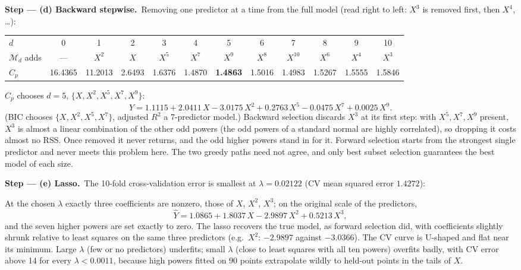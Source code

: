 \documentclass[11pt,a4paper]{article}
\numberwithin{equation}{questao}   %
\newcommand{\passo}[2]{\par\smallskip\noindent\textbf{Step --- #1.}~#2}
\begin{document}
\begin{sol}
\passo{(d) Backward stepwise}{Removing one predictor at a time from the full model (read right to
left: $X^3$ is removed first, then $X^4$, \dots):}
\begin{center}\footnotesize\setlength{\tabcolsep}{2.6pt}
\begin{tabular}{lccccccccccc}
\toprule
$d$ & 0 & 1 & 2 & 3 & 4 & 5 & 6 & 7 & 8 & 9 & 10\\
$\mathcal M_d$ adds & --- & $X^2$ & $X$ & $X^5$ & $X^7$ & $X^9$ & $X^8$ & $X^{10}$ & $X^6$ & $X^4$ & $X^3$\\
$C_p$ & 16.4365 & 11.2013 & 2.6493 & 1.6376 & 1.4870 & \textbf{1.4863} & 1.5016 & 1.4983 & 1.5267 & 1.5555 & 1.5846\\
\bottomrule
\end{tabular}
\end{center}
$C_p$ chooses $d=5$, $\{X,X^2,X^5,X^7,X^9\}$:
\[
\hat Y=1.1115+2.0411\,X-3.0175\,X^2+0.2763\,X^5-0.0475\,X^7+0.0025\,X^9 .
\]
(BIC chooses $\{X,X^2,X^5,X^7\}$, adjusted $R^2$ a 7-predictor model.) Backward selection discards
$X^3$ at its first step: with $X^5,X^7,X^9$ present, $X^3$ is almost a linear combination of the other
odd powers (the odd powers of a standard normal are highly correlated), so dropping it costs almost no
RSS. Once removed it never returns, and the odd higher powers stand in for it. Forward selection
starts from the strongest single predictor and never meets this problem here. The two greedy paths
need not agree, and only best subset selection guarantees the best model of each size.

\passo{(e) Lasso}{The 10-fold cross-validation error is smallest at $\lambda=0.02122$ (CV mean squared
error $1.4272$):}
\begin{center}
\end{center}
At the chosen $\lambda$ exactly three coefficients are nonzero, those of $X$, $X^2$, $X^3$; on the
original scale of the predictors,
\[
\hat Y=1.0865+1.8037\,X-2.9897\,X^2+0.5213\,X^3 ,
\]
and the seven higher powers are set exactly to zero. The lasso recovers the true model, as forward
selection did, with coefficients slightly shrunk relative to least squares on the same three
predictors (e.g.\ $X^2$: $-2.9897$ against $-3.0366$). The CV curve is U-shaped and flat near its
minimum. Large $\lambda$ (few or no predictors) underfits; small $\lambda$ (close to least squares with
all ten powers) overfits badly, with CV error above 14 for every $\lambda<0.0011$, because high powers
fitted on 90 points extrapolate wildly to held-out points in the tails of $X$.


\end{sol}
\end{document}
